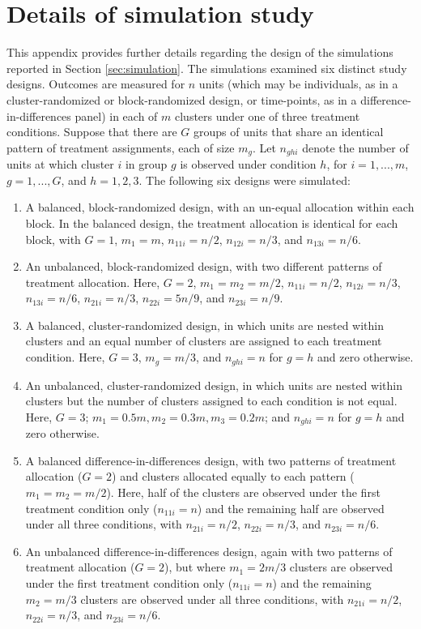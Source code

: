\documentclass[12pt]{article}\usepackage[]{graphicx}\usepackage[]{color}
\begin{document}
\section{Details of simulation study}
\label{app:simulations}

This appendix provides further details regarding the design of the simulations reported in Section \ref{sec:simulation}. The simulations examined six distinct study designs. Outcomes are measured for $n$ units (which may be individuals, as in a cluster-randomized or block-randomized design, or time-points, as in a difference-in-differences panel) in each of $m$ clusters under one of three treatment conditions. Suppose that there are $G$ groups of units that share an identical pattern of treatment assignments, each of size $m_g$. Let $n_{ghi}$ denote the number of units at which cluster $i$ in group $g$ is observed under condition $h$, for $i=1,...,m$, $g = 1,...,G$, and $h = 1,2,3$. The following six designs were simulated:
\begin{enumerate}
\item A balanced, block-randomized design, with an un-equal allocation within each block. In the balanced design, the treatment allocation is identical for each block, with $G = 1$, $m_1 = m$, $n_{11i} = n / 2$, $n_{12i} = n / 3$, and $n_{13i} = n / 6$.
\item An unbalanced, block-randomized design, with two different patterns of treatment allocation. Here, $G = 2$,  $m_1 = m_2 = m / 2$, $n_{11i} = n / 2$, $n_{12i} = n / 3$, $n_{13i} = n / 6$, $n_{21i} = n / 3$, $n_{22i} = 5 n / 9$, and $n_{23i} = n / 9$.
\item A balanced, cluster-randomized design, in which units are nested within clusters and an equal number of clusters are assigned to each treatment condition. Here, $G = 3$, $m_g = m / 3$, and $n_{ghi} = n$ for $g = h$ and zero otherwise.
\item An unbalanced, cluster-randomized design, in which units are nested within clusters but the number of clusters assigned to each condition is not equal. Here, $G = 3$; $m_1 = 0.5 m, m_2 = 0.3 m, m_3 = 0.2 m$; and $n_{ghi} = n$ for $g = h$ and zero otherwise. 
\item A balanced difference-in-differences design, with two patterns of treatment allocation ($G = 2$) and clusters allocated equally to each pattern ($m_1 = m_2 = m / 2$). Here, half of the clusters are observed under the first treatment condition only ($n_{11i} = n$) and the remaining half are observed under all three conditions, with $n_{21i} = n / 2$, $n_{22i} = n / 3$, and $n_{23i} = n / 6$.
\item An unbalanced difference-in-differences design, again with two patterns of treatment allocation ($G = 2$), but where $m_1 = 2 m / 3$ clusters are observed under the first treatment condition only ($n_{11i} = n$) and the remaining $m_2 = m / 3$ clusters are observed under all three conditions, with  $n_{21i} = n / 2$, $n_{22i} = n / 3$, and $n_{23i} = n / 6$.
\end{enumerate}



\end{document}
